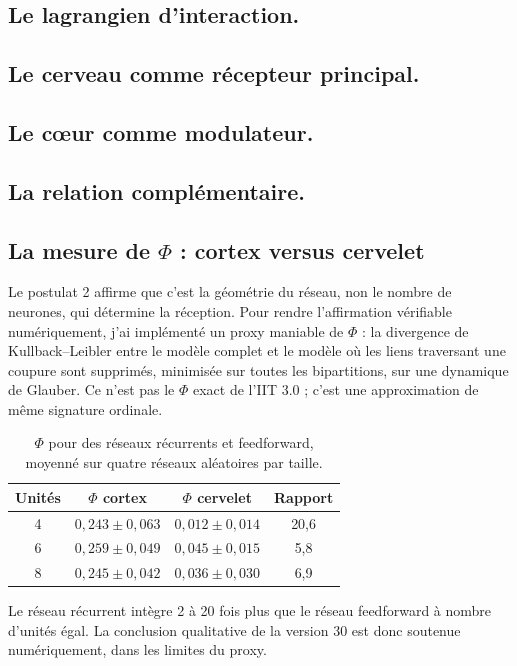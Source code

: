 \subsection{Le lagrangien d'interaction.}
\subsection{Le cerveau comme récepteur principal.}
\subsection{Le cœur comme modulateur.}
\subsection{La relation complémentaire.}

\subsection{La mesure de \texorpdfstring{$\Phi$}{Phi} : cortex versus cervelet}
Le postulat 2 affirme que c'est la géométrie du réseau, non le nombre de neurones, qui détermine la réception. Pour rendre l'affirmation vérifiable numériquement, j'ai implémenté un proxy maniable de $\Phi$ : la divergence de Kullback--Leibler entre le modèle complet et le modèle où les liens traversant une coupure sont supprimés, minimisée sur toutes les bipartitions, sur une dynamique de Glauber. Ce n'est pas le $\Phi$ exact de l'IIT 3.0 ; c'est une approximation de même signature ordinale.

\begin{table}[H]
\centering
\begin{tabular}{@{}cccc@{}}
\toprule
Unités & $\Phi$ cortex & $\Phi$ cervelet & Rapport \\ \midrule
4 & $0,243 \pm 0,063$ & $0,012 \pm 0,014$ & 20,6 \\
6 & $0,259 \pm 0,049$ & $0,045 \pm 0,015$ & 5,8 \\
8 & $0,245 \pm 0,042$ & $0,036 \pm 0,030$ & 6,9 \\ \bottomrule
\end{tabular}
\caption{$\Phi$ pour des réseaux récurrents et feedforward, moyenné sur quatre réseaux aléatoires par taille.}
\label{tab:phi}
\end{table}

Le réseau récurrent intègre 2 à 20 fois plus que le réseau feedforward à nombre d'unités égal. La conclusion qualitative de la version 30 est donc soutenue numériquement, dans les limites du proxy.

